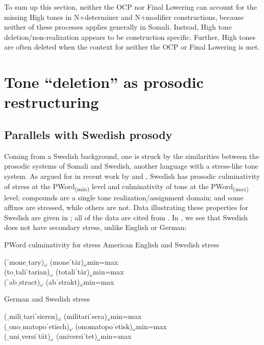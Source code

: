 \documentclass[output=paper]{langscibook}
\begin{document}
To sum up this section, neither the OCP nor Final Lowering can account for the missing High tones in N+determiner and N+modifier constructions, because neither of these processes applies generally in Somali. Instead, High tone deletion\slash non-realization appears to be construction specific. Further, High tones are often deleted when the context for neither the OCP or Final Lowering is met.


\section{Tone ``deletion'' as prosodic restructuring}
\label{sec:downing:4}

\subsection{Parallels with Swedish prosody}


Coming from a Swedish background, one is struck by the similarities between the prosodic systems of Somali and Swedish, another language with a stress-like tone system. As argued for in recent work by \citet{Riad2012, Riad2016} and \citet{Myrberg2015}, Swedish has prosodic culminativity of stress at the PWord\textsubscript{(min)} level and culminativity of tone at the PWord\textsubscript{(max)} level; compounds are a single tone realization\slash assignment domain; and some affixes are stressed, while others are not. Data illustrating these properties for Swedish are given in ; all of the data are cited from \citet{Myrberg2015}. In , we see that Swedish does not have secondary stress, unlike English or German:

\ea  PWord culminativity for stress \label{ex:downing:13}
\ea  American English and Swedish stress
\begin{xlist}
\ex  (ˈmoneˌtary)$_ω$  (moneˈtär)$_ω$min=max\\
\ex  (toˌtaliˈtarian)$_ω$  (totaliˈtär)$_ω$min=max\\
\ex  (ˈabˌstract)$_ω$  (abˈstrakt)$_ω$min=max\\
\end{xlist}
\ex  German and Swedish stress\\
\begin{xlist}
\ex  (ˌmiliˌtariˈsieren)$_ω$  (militariˈsera)$_ω$min=max\\
\ex  (ˌonoˌmatopoˈetisch)$_ω$  (onomatopoˈetisk)$_ω$min=max\\
\ex  (ˌuniˌversiˈtät)$_ω$  (universiˈtet)$_ω$min=max\\
\end{xlist}
\z
\z
\end{document}
